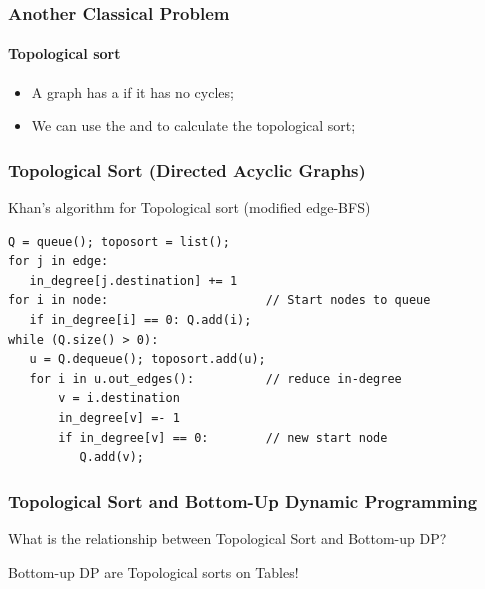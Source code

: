 \documentclass{beamer}
\begin{document}
\begin{frame}
  \frametitle{Another Classical Problem}
  \framesubtitle{Topological sort}

  \begin{itemize}
  \item A  graph has a  if it has \alert{no cycles};
  \item We can use the  and
     to calculate the topological sort;
  \end{itemize}
  
  \begin{center}
  \end{center}
\end{frame}

\begin{frame}[fragile]
  \frametitle{Topological Sort (Directed Acyclic Graphs)} 
  
  {\smaller 

    \begin{exampleblock}{Khan's algorithm for Topological sort (modified edge-BFS)}
\begin{verbatim}
Q = queue(); toposort = list();
for j in edge:
   in_degree[j.destination] += 1
for i in node:                      // Start nodes to queue
   if in_degree[i] == 0: Q.add(i);
while (Q.size() > 0):
   u = Q.dequeue(); toposort.add(u);
   for i in u.out_edges():          // reduce in-degree
       v = i.destination
       in_degree[v] =- 1
       if in_degree[v] == 0:        // new start node
          Q.add(v);
\end{verbatim}
    \end{exampleblock}
  }
\end{frame}

\begin{frame}
  \frametitle{Topological Sort and Bottom-Up Dynamic Programming}

  What is the relationship between Topological Sort and Bottom-up DP?

  \bigskip

  Bottom-up DP are Topological sorts on Tables!
\end{frame}
\end{document}
